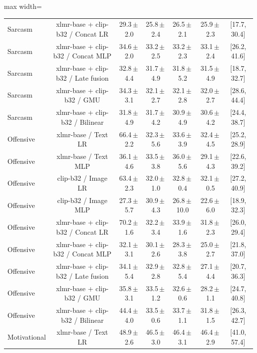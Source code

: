 \begin{table}[t]
\begin{adjustbox}{max width=\textwidth}
\begin{tabular}{lcccccc}
Sarcasm & xlmr-base + clip-b32 / Concat LR & 29.3\,$\pm$\,2.0 & 25.8\,$\pm$\,2.4 & 26.5\,$\pm$\,2.1 & 25.9\,$\pm$\,2.3 & [17.7, 30.4] \\
Sarcasm & xlmr-base + clip-b32 / Concat MLP & 34.6\,$\pm$\,2.0 & 33.2\,$\pm$\,2.5 & 33.2\,$\pm$\,2.3 & 33.1\,$\pm$\,2.4 & [26.2, 41.6] \\
Sarcasm & xlmr-base + clip-b32 / Late fusion & 32.8\,$\pm$\,4.4 & 31.7\,$\pm$\,4.9 & 31.8\,$\pm$\,5.2 & 31.5\,$\pm$\,4.9 & [18.7, 32.7] \\
Sarcasm & xlmr-base + clip-b32 / GMU & 34.3\,$\pm$\,3.1 & 32.1\,$\pm$\,2.7 & 32.1\,$\pm$\,2.8 & 32.0\,$\pm$\,2.7 & [28.6, 44.4] \\
Sarcasm & xlmr-base + clip-b32 / Bilinear & 31.8\,$\pm$\,4.9 & 31.7\,$\pm$\,4.2 & 30.9\,$\pm$\,4.9 & 30.6\,$\pm$\,4.2 & [24.4, 38.7] \\
Offensive & xlmr-base / Text LR & 66.4\,$\pm$\,2.2 & 32.3\,$\pm$\,5.6 & 33.6\,$\pm$\,3.9 & 32.4\,$\pm$\,4.5 & [25.2, 28.9] \\
Offensive & xlmr-base / Text MLP & 36.1\,$\pm$\,4.6 & 33.5\,$\pm$\,3.8 & 36.0\,$\pm$\,5.6 & 29.1\,$\pm$\,4.3 & [22.6, 39.2] \\
Offensive & clip-b32 / Image LR & 63.4\,$\pm$\,2.3 & 32.0\,$\pm$\,1.0 & 32.8\,$\pm$\,0.4 & 32.1\,$\pm$\,0.5 & [27.2, 40.9] \\
Offensive & clip-b32 / Image MLP & 27.3\,$\pm$\,5.7 & 30.9\,$\pm$\,4.3 & 26.8\,$\pm$\,10.0 & 22.6\,$\pm$\,6.0 & [18.9, 32.3] \\
Offensive & xlmr-base + clip-b32 / Concat LR & 70.2\,$\pm$\,1.6 & 32.2\,$\pm$\,3.4 & 33.9\,$\pm$\,1.6 & 31.8\,$\pm$\,2.3 & [26.0, 29.4] \\
Offensive & xlmr-base + clip-b32 / Concat MLP & 32.1\,$\pm$\,3.1 & 30.1\,$\pm$\,2.6 & 28.3\,$\pm$\,3.8 & 25.0\,$\pm$\,2.7 & [21.8, 37.0] \\
Offensive & xlmr-base + clip-b32 / Late fusion & 34.1\,$\pm$\,5.4 & 32.9\,$\pm$\,2.8 & 32.8\,$\pm$\,5.4 & 27.1\,$\pm$\,4.4 & [20.7, 36.3] \\
Offensive & xlmr-base + clip-b32 / GMU & 35.8\,$\pm$\,3.1 & 33.5\,$\pm$\,1.2 & 32.6\,$\pm$\,0.6 & 28.2\,$\pm$\,1.1 & [24.7, 40.8] \\
Offensive & xlmr-base + clip-b32 / Bilinear & 44.4\,$\pm$\,4.0 & 33.5\,$\pm$\,0.6 & 33.7\,$\pm$\,1.1 & 31.8\,$\pm$\,1.5 & [26.3, 42.7] \\
Motivational & xlmr-base / Text LR & 48.9\,$\pm$\,2.6 & 46.5\,$\pm$\,3.0 & 46.4\,$\pm$\,3.1 & 46.4\,$\pm$\,2.9 & [41.0, 57.4] \\

\end{tabular}
\end{adjustbox}
\end{table}
